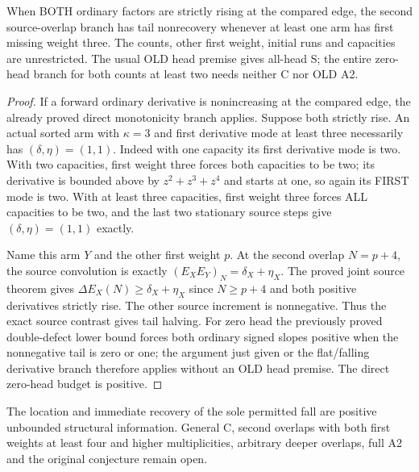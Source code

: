 \begin{corollary}
When BOTH ordinary factors are strictly rising at the compared edge,
the second source-overlap branch has tail nonrecovery whenever at least
one arm has first missing weight three. The counts, other first weight,
initial runs and capacities are unrestricted. The usual OLD head premise
gives all-head S; the entire zero-head branch for both counts at least two
needs neither C nor OLD A2.
\end{corollary}
\begin{proof}
If a forward ordinary derivative is nonincreasing at the compared edge,
the already proved direct monotonicity branch applies. Suppose both
strictly rise. An actual sorted arm with $\kappa=3$ and first derivative
mode at least three necessarily has $(\delta,\eta)=(1,1)$.
Indeed with one capacity its first derivative mode is two. With two
capacities, first weight three forces both capacities to be two;
its derivative is bounded above by $z^2+z^3+z^4$ and starts at one,
so again its FIRST mode is two. With at least three capacities, first
weight three forces ALL capacities to be two, and the last two stationary
source steps give $(\delta,\eta)=(1,1)$ exactly.

Name this arm $Y$ and the other first weight $p$. At the second overlap
$N=p+4$, the source convolution is exactly
$(E_XE_Y)_N=\delta_X+\eta_X$.
The proved joint source theorem gives
$\Delta E_X(N)\ge\delta_X+\eta_X$ since $N\ge p+4$ and both
positive derivatives strictly rise. The other source increment is
nonnegative. Thus the exact source contrast gives tail halving.
For zero head the previously proved double-defect lower bound forces both
ordinary signed slopes positive when the nonnegative tail is zero or one;
the argument just given or the flat/falling derivative branch therefore
applies without an OLD head premise. The direct zero-head budget is positive.
\end{proof}

The location and immediate recovery of the sole permitted fall are
positive unbounded structural information. General C, second overlaps
with both first weights at least four and higher multiplicities,
arbitrary deeper overlaps, full A2 and the original conjecture remain open.
